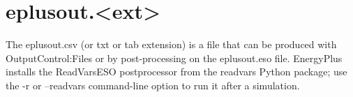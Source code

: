 \section{eplusout.\textless{}ext\textgreater{}}\label{eplusout.ext}

The eplusout.csv (or txt or tab extension) is a file that can be produced with OutputControl:Files or by post-processing on the eplusout.eso file. EnergyPlus installs the ReadVarsESO postprocessor from the readvars Python package; use the -r or --readvars command-line option to run it after a simulation.
